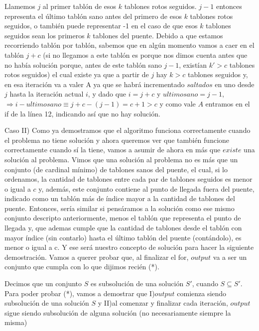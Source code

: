 \documentclass{article}
\begin{document}
Llamemos $j$ al primer tabl\'on de esos $k$ tablones rotos seguidos. $j-1$ entonces representa el \'ultimo tabl\'on sano antes del primero de esos $k$ tablones rotos seguidos, o tambi\'en puede representar -1 en el caso de que esos $k$ tablones seguidos sean los primeros $k$ tablones del puente.
\newline Debido a que estamos recorriendo tabl\'on por tabl\'on, sabemos que en alg\'un momento vamos a caer en el tabl\'on $j + c$ (si no llegamos a este tabl\'on es porque nos dimos cuenta antes que no hab\'ia soluci\'on porque, antes de este tabl\'on sano $j - 1$, exist\'ian $k' > c$ tablones rotos seguidos) el cual existe ya que a partir de $j$ hay $k > c$ tablones seguidos y, en esa iteraci\'on va a valer A ya que se habr\'a incrementado $saltados$ en uno desde $j$ hasta la iteraci\'on actual $i$, y dado que $i = j + c$ y $ultimosano = j - 1 $, $ \Rightarrow i - ultimosano \equiv  j + c - (j - 1) =  c + 1 > c$ y como vale $A$ entramos en el if de la l\'inea 12, indicando as\'i que no hay soluci\'on.

\vspace{1cm} \noindent Caso II) Como ya demostramos que el algoritmo funciona correctamente cuando el problema no tiene soluci\'on y ahora queremos ver que tambi\'en funcione correctamente cuando s\'i la tiene, vamos a asumir de ahora en m\'as que $existe$ una soluci\'on al problema.
\newline Vimos que una soluci\'on al problema no es m\'as que un conjunto (de cardinal m\'inimo) de tablones sanos del puente, el cual, si lo ordenamos, la cantidad de tablones entre cada par de tablones seguidos es menor o igual a $c$ y, adem\'as, este conjunto contiene al punto de llegada fuera del puente, indicado como un tabl\'on m\'as de \'indice mayor a la cantidad de tablones del puente. Entonces, ser\'ia similar si pens\'aramos a la soluci\'on como ese mismo conjunto descripto anteriormente, menos el tabl\'on que representa el punto de llegada y, que ademas cumple que la cantidad de tablones desde el tabl\'on con mayor \'indice (sin contarlo) hasta el \'ultimo tabl\'on del puente (cont\'andolo), es menor o igual a c. Y ese ser\'a nuestro concepto de soluci\'on para hacer la siguiente demostraci\'on.
\newline Vamos a querer probar que, al finalizar el for, $output$ va a ser un conjunto que cumpla con lo que dijimos reci\'en (*).

\vspace{0.5cm}\noindent Decimos que un conjunto $S$ es subsoluci\'on de una soluci\'on $S'$, cuando $S \subseteq S'$.
\newline Para poder probar (*), vamos a demostrar que I)$output$ comienza siendo subsoluci\'on de una soluci\'on $S$ y II)al comenzar y finalizar cada iteraci\'on, $output$ sigue siendo subsoluci\'on de alguna soluci\'on (no necesariamente siempre la misma)
\end{document}
